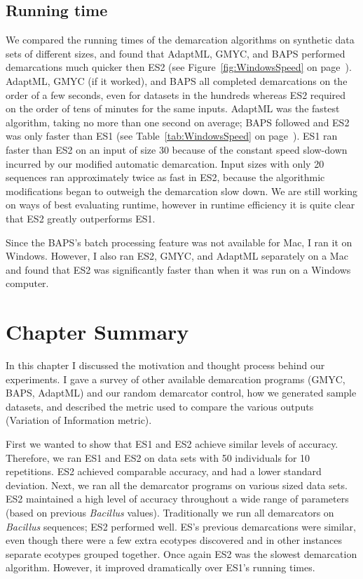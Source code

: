 \subsection*{Running time}
We compared the running times of the demarcation algorithms on synthetic data sets of different sizes, and found that AdaptML, GMYC, and BAPS performed demarcations much quicker then ES2 (see Figure~\ref{fig:WindowsSpeed} on page~\pageref{fig:WindowsSpeed}).
AdaptML, GMYC (if it worked), and BAPS all completed demarcations on the order of a few seconds, even for datasets in the hundreds whereas ES2 required on the order of tens of minutes for the same inputs.
AdaptML was the fastest algorithm, taking no more than one second on average; BAPS followed and ES2 was only faster than ES1 (see Table~\ref{tab:WindowsSpeed} on page~\pageref{tab:WindowsSpeed}).
ES1 ran faster than ES2 on an input of size 30 because of the constant speed slow-down incurred by our modified automatic demarcation.
Input sizes with only 20 sequences ran approximately twice as fast in ES2, because the algorithmic modifications began to outweigh the demarcation slow down.
We are still working on ways of best evaluating runtime, however in runtime efficiency it is quite clear that ES2 greatly outperforms ES1.

Since the BAPS's batch processing feature was not available for Mac, I ran it on Windows.
However, I also ran ES2, GMYC, and AdaptML separately on a Mac and found that ES2 was significantly faster than when it was run on a Windows computer.

\section{Chapter Summary}
In this chapter I discussed the motivation and thought process behind our experiments.
I gave a survey of other available demarcation programs (GMYC, BAPS, AdaptML) and our random demarcator control, how we generated sample datasets, and described the metric used to compare the various outputs (Variation of Information metric).

First we wanted to show that ES1 and ES2 achieve similar levels of accuracy.
Therefore, we ran ES1 and ES2 on data sets with 50 individuals for 10 repetitions.
ES2 achieved comparable accuracy, and had a lower standard deviation.
Next, we ran all the demarcator programs on various sized data sets.
ES2 maintained a high level of accuracy throughout a wide range of parameters (based on previous \emph{Bacillus} values).
Traditionally we run all demarcators on \emph{Bacillus} sequences; ES2 performed well.
ES's previous demarcations were similar, even though there were a few extra ecotypes discovered and in other instances separate ecotypes grouped together.
Once again ES2 was the slowest demarcation algorithm.
However, it improved dramatically over ES1's running times.


